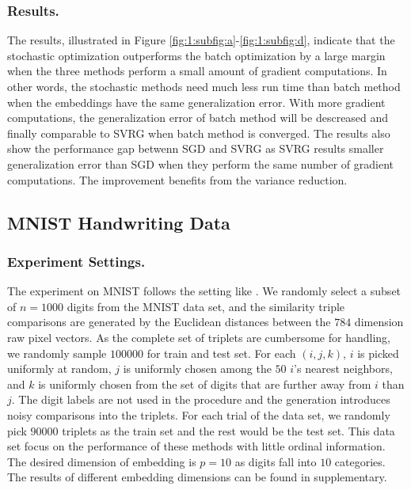 \documentclass[letterpaper]{article}
\begin{document}
		\subsubsection{Results.}
		The results, illustrated in Figure \ref{fig:1:subfig:a}-\ref{fig:1:subfig:d}, indicate that the stochastic optimization outperforms the batch optimization by a large margin when the three methods perform a small amount of gradient computations. In other words, the stochastic methods need much less run time than batch method when the embeddings have the same generalization error. With more gradient computations, the generalization error of batch method will be descreased and finally comparable to SVRG when batch method is converged. The results also show the performance gap betwenn SGD and SVRG as SVRG results smaller generalization error than SGD when they perform the same number of gradient computations. The improvement benefits from the variance reduction. 


		\subsection{MNIST Handwriting Data}

		\subsubsection{Experiment Settings.}
		The experiment on MNIST follows the setting like \cite{vandermaaten2012stochastic}. We randomly select a subset of $n=1000$ digits from the MNIST data set, and the similarity triple comparisons are generated by the Euclidean distances between the $784$ dimension raw pixel vectors. As the complete set of triplets are cumbersome for handling, we randomly sample $100000$ for train and test set. For each $(i, j, k)$, $i$ is picked uniformly at random, $j$ is uniformly chosen among the $50$ $i$'s nearest neighbors, and $k$ is uniformly chosen from the set of digits that are further away from $i$ than $j$. The digit labels are not used in the procedure and the generation introduces noisy comparisons into the triplets. For each trial of the data set, we randomly pick $90000$ triplets as the train set and the rest would be the test set. This data set focus on the performance of these methods with little ordinal information. The desired dimension of embedding is $p = 10$ as digits fall into $10$ categories. The results of different embedding dimensions can be found in supplementary.
\end{document}
